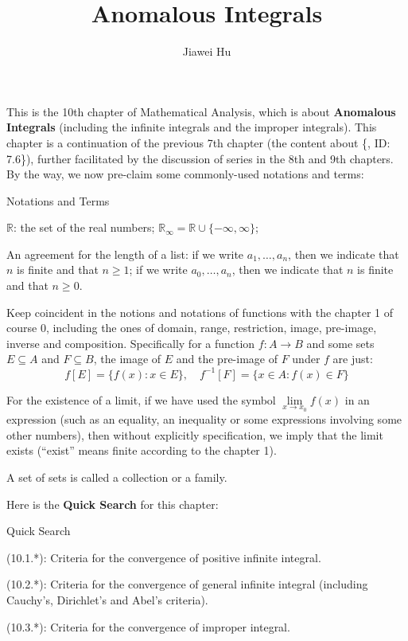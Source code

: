 \documentclass{article}
\title{\LARGE \textbf{Anomalous Integrals}}
\author{\large Jiawei Hu}
\begin{document}
\maketitle

This is the 10th chapter of Mathematical Analysis, which is about \textbf{Anomalous Integrals} (including the infinite integrals and the improper integrals). This chapter is a continuation of the previous 7th chapter (the content about \{, ID: 7.6\}), further facilitated by the discussion of series in the 8th and 9th chapters. \\
By the way, we now pre-claim some commonly-used notations and terms:
\begin{Df}{Notations and Terms}
    \begin{compactenum}
        \item $\mathbb{R}$: the set of the real numbers; $\mathbb{R}_\infty = \mathbb{R}\cup\{-\infty, \infty\}$;
        \item An agreement for the length of a list: if we write $a_1, \dots, a_n$, then we indicate that $n$ is finite and that $n\geq 1$; if we write $a_0, \dots, a_n$, then we indicate that $n$ is finite and that $n\geq 0$.
        \item Keep coincident in the notions and notations of functions with the chapter 1 of course 0, including the ones of domain, range, restriction, image, pre-image, inverse and composition. Specifically for a function $f: A\rightarrow B$ and some sets $E\subseteq A$ and $F\subseteq B$, the image of $E$ and the pre-image of $F$ under $f$ are just:
        $$f[E] = \{f(x): x\in E\},\quad f^{-1}[F] = \{x\in A: f(x)\in F\}$$
        \item For the existence of a limit, if we have used the symbol $\lim\limits_{x\to x_0} f(x)$ in an expression (such as an equality, an inequality or some expressions involving some other numbers), then without explicitly specification, we imply that the limit exists (``exist'' means finite according to the chapter 1).
        \item A set of sets is called a collection or a family.
    \end{compactenum}
\end{Df}

Here is the \textbf{Quick Search} for this chapter:
\begin{Th}{Quick Search}
    \begin{compactdesc}
        \item (10.1.*): Criteria for the convergence of positive infinite integral.
        \item (10.2.*): Criteria for the convergence of general infinite integral (including Cauchy's, Dirichlet's and Abel's criteria).
        \item (10.3.*): Criteria for the convergence of improper integral.
    \end{compactdesc}
\end{Th}
\end{document}
